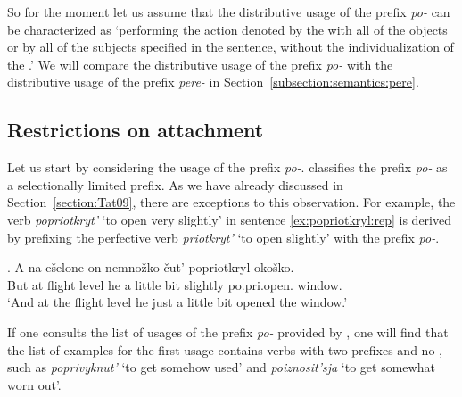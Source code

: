 So for the moment let us assume that the distributive usage of the prefix \textit{po-} can be characterized as `performing the action denoted by the  with all of the objects or by all of the subjects specified in the sentence, without the individualization of the .' We will compare the distributive usage of the prefix \textit{po-} with the distributive usage of the prefix \textit{pere-} in Section~\ref{subsection:semantics:pere}.

\subsection{Restrictions on attachment} 
Let us start by considering the  usage of the prefix \textit{po-}. \citet{Tatevosov:09} classifies the  prefix \textit{po-} as a selectionally limited prefix. As we have already discussed in Section~\ref{section:Tat09}, there are exceptions to this observation. For example, the verb \textit{popriotkryt'} `to open very slightly' in sentence \ref{ex:popriotkryl:rep} is derived by prefixing the perfective verb \textit{priotkryt'} `to open slightly' with the  prefix \textit{po-}.

\exg. \label{ex:popriotkryl:rep}A na e\v{s}elone on nemno\v{z}ko \v{c}ut' popriotkryl oko\v{s}ko.\\
But at {flight level} he {a little bit} {slightly} po.pri.open. window.\\
\trans `And at the flight level he just a little bit opened the window.'\\

If one consults the list of usages of the prefix \textit{po-} provided by \citet{Shvedova:82}, one will find that the list of examples for the first usage contains verbs with two prefixes and no , such as \textit{poprivyknut'} `to get somehow used' and \textit{poiznosit'sja} `to get somewhat worn out'. 


